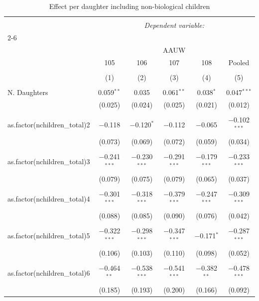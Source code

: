 
\begin{table}[!htbp] \centering 
  \caption{Effect per daughter including non-biological children} 
  \label{} 
\small 
\begin{tabular}{@{\extracolsep{5pt}}lccccc} 
\\[-1.8ex]\hline 
\hline \\[-1.8ex] 
 & \multicolumn{5}{c}{\textit{Dependent variable:}} \\ 
\cline{2-6} 
\\[-1.8ex] & \multicolumn{5}{c}{AAUW} \\ 
 & 105 & 106 & 107 & 108 & Pooled \\ 
\\[-1.8ex] & (1) & (2) & (3) & (4) & (5)\\ 
\hline \\[-1.8ex] 
 N. Daughters & 0.059$^{**}$ & 0.035 & 0.061$^{**}$ & 0.038$^{*}$ & 0.047$^{***}$ \\ 
  & (0.025) & (0.024) & (0.025) & (0.021) & (0.012) \\ 
  & & & & & \\ 
 as.factor(nchildren\_total)2 & $-$0.118 & $-$0.120$^{*}$ & $-$0.112 & $-$0.065 & $-$0.102$^{***}$ \\ 
  & (0.073) & (0.069) & (0.072) & (0.059) & (0.034) \\ 
  & & & & & \\ 
 as.factor(nchildren\_total)3 & $-$0.241$^{***}$ & $-$0.230$^{***}$ & $-$0.291$^{***}$ & $-$0.179$^{***}$ & $-$0.233$^{***}$ \\ 
  & (0.079) & (0.075) & (0.079) & (0.065) & (0.037) \\ 
  & & & & & \\ 
 as.factor(nchildren\_total)4 & $-$0.301$^{***}$ & $-$0.318$^{***}$ & $-$0.379$^{***}$ & $-$0.247$^{***}$ & $-$0.309$^{***}$ \\ 
  & (0.088) & (0.085) & (0.090) & (0.076) & (0.042) \\ 
  & & & & & \\ 
 as.factor(nchildren\_total)5 & $-$0.322$^{***}$ & $-$0.298$^{***}$ & $-$0.347$^{***}$ & $-$0.171$^{*}$ & $-$0.287$^{***}$ \\ 
  & (0.106) & (0.103) & (0.110) & (0.098) & (0.052) \\ 
  & & & & & \\ 
 as.factor(nchildren\_total)6 & $-$0.464$^{**}$ & $-$0.538$^{***}$ & $-$0.541$^{***}$ & $-$0.382$^{**}$ & $-$0.478$^{***}$ \\ 
  & (0.185) & (0.193) & (0.200) & (0.166) & (0.092) \\ 

\end{tabular}
\end{table}
